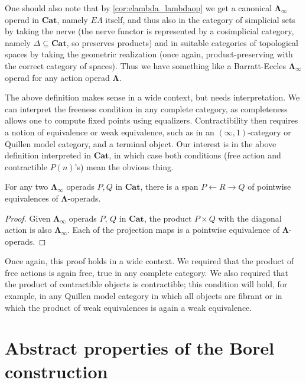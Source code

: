 \documentclass{amsbook} %
\newcommand{\mb}{\mathbf}
\numberwithin{section}{chapter}
\begin{document}
\begin{rem}
One should also note that by \cref{cor:elambda_lambdaop} we get a canonical $\mb{\Lambda}_{\infty}$ operad in $\mb{Cat}$, namely $E\Lambda$ itself, and thus also in the category of simplicial sets by taking the nerve (the nerve functor is represented by a cosimplicial category, namely $\Delta \subseteq \mb{Cat}$, so preserves products) and in suitable categories of topological spaces by taking the geometric realization (once again, product-preserving with the correct category of spaces).  Thus we have something like a Barratt-Eccles $\mb{\Lambda}_{\infty}$ operad for any action operad $\mb{\Lambda}$.
\end{rem}

\begin{rem}
The above definition makes sense in a wide context, but needs interpretation.  We can interpret the freeness condition in any complete category, as completeness allows one to compute fixed points using equalizers.  Contractibility then requires a notion of equivalence or weak equivalence, such as in an $(\infty, 1)$-category or Quillen model category, and a terminal object.  Our interest is in the above definition interpreted in $\mb{Cat}$, in which case both conditions (free action and contractible $P(n)$'s) mean the obvious thing.
\end{rem}

\begin{prop}
For any two $\mb{\Lambda}_{\infty}$ operads $P,Q$ in $\mb{Cat}$, there is a span $P \leftarrow R \rightarrow Q$  of pointwise equivalences of $\mb{\Lambda}$-operads.
\end{prop}
\begin{proof}
Given $\mb{\Lambda}_{\infty}$ operads $P$, $Q$ in $\mb{Cat}$, the product $P \times Q$ with the diagonal action is also $\mb{\Lambda}_{\infty}$.  Each of the projection maps is a pointwise equivalence of $\mb{\Lambda}$-operads.
\end{proof}
\begin{rem}
Once again, this proof holds in a wide context.  We required that the product of free actions is again free, true in any complete category.  We also required that the product of contractible objects is contractible; this condition will hold, for example, in any Quillen model category in which all objects are fibrant or in which the product of weak equivalences is again a weak equivalence.
\end{rem}


\section{Abstract properties of the Borel construction}
\end{document}
